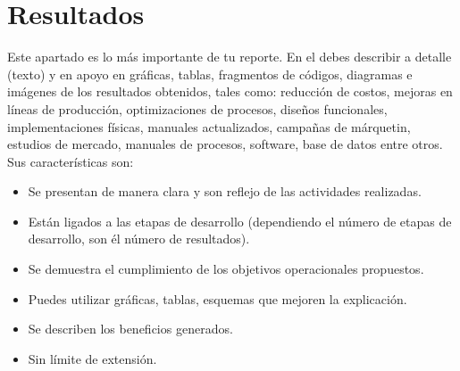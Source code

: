 \section{Resultados}
Este apartado es lo más importante de tu reporte. En el debes describir a detalle
(texto) y en apoyo en gráficas, tablas, fragmentos de códigos, diagramas e
imágenes de los resultados obtenidos, tales como: reducción de costos, mejoras en
líneas de producción, optimizaciones de procesos, diseños funcionales,
implementaciones físicas, manuales actualizados, campañas de márquetin, estudios
de mercado, manuales de procesos, software, base de datos entre otros. Sus
características son:

\begin{itemize}
\item Se presentan de manera clara y son reflejo de las actividades realizadas.
\item Están ligados a las etapas de desarrollo (dependiendo el número de etapas
de desarrollo, son él número de resultados).
\item Se demuestra el cumplimiento de los objetivos operacionales propuestos.
\item Puedes utilizar gráficas, tablas, esquemas que mejoren la explicación.
\item Se describen los beneficios generados.
\item Sin límite de extensión.
\end{itemize}